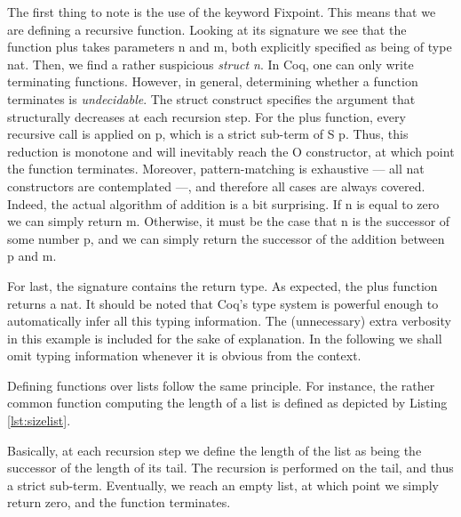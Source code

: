 	\noindent The first thing to note is the use of the keyword \textsf{Fixpoint}. This
	 means that we are defining a recursive function. Looking at its signature
	 we see that the function \textsf{plus} takes parameters \textsf{n} and
	 \textsf{m}, both explicitly specified as being of type \textsf{nat}.
     Then, we find a rather suspicious \textit{\textbraceleft struct n\textbraceright}.	
	In Coq, one can only write terminating functions. However, in general, determining
	whether a function terminates is \textit{undecidable}. The \textsf{struct} construct
	specifies the argument that structurally decreases at each recursion step. For the
	\textsf{plus} function, every recursive call is applied on \textsf{p}, which is a strict
	sub-term of \textsf{S p}. Thus, this reduction is monotone and will inevitably reach
	the \textsf{O} constructor, at which point the function terminates. Moreover,
	pattern-matching is exhaustive --- all \textsf{nat} constructors are contemplated ---,
	and therefore all cases are always covered. Indeed, the actual algorithm of addition
	is a bit surprising. If \textsf{n} is equal to zero we can simply return \textsf{m}. Otherwise,
	it must be the case that \textsf{n} is the successor of some number \textsf{p},
	and we can simply return the successor of the addition between \textsf{p} and
	\textsf{m}.	
	
	For last, the signature contains the return type. As expected, the \textsf{plus} function 
	returns a \textsf{nat}.
	 It should be noted that Coq's type system is powerful enough to automatically
	infer all this typing information. The (unnecessary) extra verbosity in this 
	example is included for the sake of explanation. In the following we shall omit 
	typing information whenever it is obvious from the context.
	
	Defining functions over lists follow the same principle. For instance, the rather
	common function computing the length of a list is defined as
	depicted by Listing \ref{lst:sizelist}.
	
		

	\noindent Basically, at each recursion step we define the length of the list
	as being the successor of the length of its tail. The recursion is performed
	on the tail, and thus a strict sub-term. Eventually, we reach an empty list,
	at which point we simply return zero, and the function terminates. 
	
	
	
